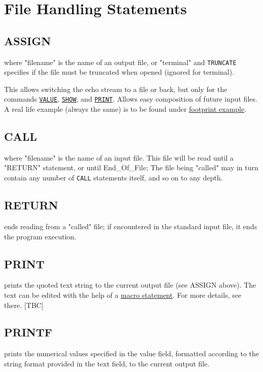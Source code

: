 \chapter{File Handling Statements}
\label{chap:files}

\section{ASSIGN}
\label{sec:assign}

where "filename" is the name of an output file, or "terminal" and
{\tt TRUNCATE} specifies if the file must be truncated when opened (ignored
for terminal). 

This allows switching the echo stream to a file or back,
but only for the commands \hyperref[sec:value]{\tt VALUE}, 
\hyperref[sec:show]{\tt SHOW}, and \hyperref[sec:print]{\tt PRINT}. 
Allows easy composition of future \madx input files. A real life example 
(always the same) is to be found under \href{foot.html}{footprint example}.  

\section{CALL}
\label{sec:call}
where "filename"  is the name of an input file. This file will be read
until a "RETURN" statement, or until End\_Of\_File; The file being
"called" may in turn contain any number of {\tt CALL} statements
itself, and so on to any depth.  

\section{RETURN}
\label{Sec:return}
ends reading from a "called" file; if encountered in the standard input
file, it ends the program execution.  


\section{PRINT}
\label{sec:print}
prints the quoted text string to the current output file (see ASSIGN
above). The text can be edited with the help of a
\href{special.html#macro}{macro statement}. For more details, see
there. [TBC]  


\section{PRINTF}
\label{sec:printf}
prints the numerical values specified in the value field, formatted
according to the string format provided in the text field, to the
current output file.  


